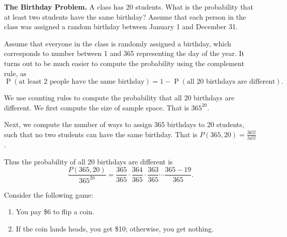 \documentclass[11pt]{exam}
\DeclareMathOperator*{\Prob}{P}
\renewcommand{\Pr}{\Prob}
\begin{document}
\begin{questions}
\begin{parts}

\end{parts}


\question \textbf{The Birthday Problem.} A class has 20 students.  What is the probability that at least
two students have the same birthday?  Assume that each person in the class was
assigned a random birthday between January 1 and December 31.

\begin{solution}
Assume that everyone in the class is randomly assigned a birthday, which
corresponds to number between 1 and 365 representing the day of the year.
It turns out to be much easier to compute the probability using the complement
rule, as
\[
  \Pr(\text{at least 2 people have the same birthday})
  = 1 - \Pr(\text{all 20 birthdays are different}).
\]

We use counting rules to compute the probability that all 20 birthdays are different. 
We first compute the size of sample space. That is $365^{20}$.

Next, we compute the number of ways to assign 365 birthdays to 20 students, such that no two students can have the same birthday.
That is $P(365,20)=\frac{365!}{345!}$.

Thus the probability of all 20 birthdays are different is
$$\frac{P(365,20)}{365^{20}} = \frac{365}{365}\cdot \frac{364}{365}\cdot\frac{363}{365}\cdots \frac{365-19}{365}.$$

\end{solution}


\newpage
{}

\question \label{ques:rv-coinflip-game} Consider the following game:
\begin{enumerate}
\item You pay \$6 to flip a coin.
\item If the coin lands heads, you get \$10; otherwise, you get nothing.
\end{enumerate}

\end{questions}
\end{document}
